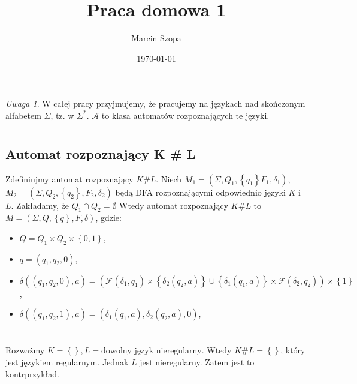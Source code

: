 \documentclass{article}
\title{Praca domowa 1}
\author{Marcin Szopa}
\date{\today}
\theoremstyle{definition}
\theoremstyle{remark}
\newtheorem*{remark}{Uwaga}
\newcommand{\singleton}[1]{\left\{ #1 \right\}}
\begin{document}
\maketitle

\begin{remark}
    W całej pracy przyjmujemy, że pracujemy na językach nad skończonym alfabetem \(\Sigma\), tz. w \( \Sigma^* \). \(\mathcal{A}\) to klasa automatów rozpoznających te języki.
\end{remark}

\section{}

\subsection{Automat rozpoznający K \# L}

Zdefiniujmy automat rozpoznający \(K \# L\).
Niech \(M_1 = (\Sigma, Q_1, \singleton{q_1} F_1, \delta_1)\), \(M_2 = (\Sigma, Q_2, \singleton{q_2}, F_2, \delta_2)\)
będą DFA rozpoznającymi odpowiednio języki \(K\) i \(L\). Zakładamy, że \(Q_1 \cap Q_2 = \emptyset\) Wtedy automat rozpoznający \(K \# L\) to
\(M = (\Sigma, Q, \singleton{q}, F, \delta)\), gdzie:

\begin{itemize}
    \item \(Q = Q_1 \times Q_2 \times \left\{ 0, 1 \right\}\),
    \item \(q = (q_1, q_2, 0)\),
    \item \(\delta((q_1, q_2, 0), a) =  \left( \mathcal{F}(\delta_1, q_1) \times \singleton{\delta_2(q_2,a)} \cup \singleton{\delta_1(q_1,a)} \times \mathcal{F}(\delta_2, q_2) \right) \times \singleton{1}\),
    \item \(\delta((q_1, q_2, 1), a) =  \left( \delta_1(q_1,a), \delta_2(q_2,a), 0 \right)\),
\end{itemize}

\section{}

Rozważmy \(K = \left\{ \right\}, L = \text{dowolny język nieregularny}\). Wtedy
\(K \# L = \left\{ \right\}\), który jest językiem regularnym. Jednak \(L\)
jest nieregularny. Zatem jest to kontrprzykład.
\end{document}
